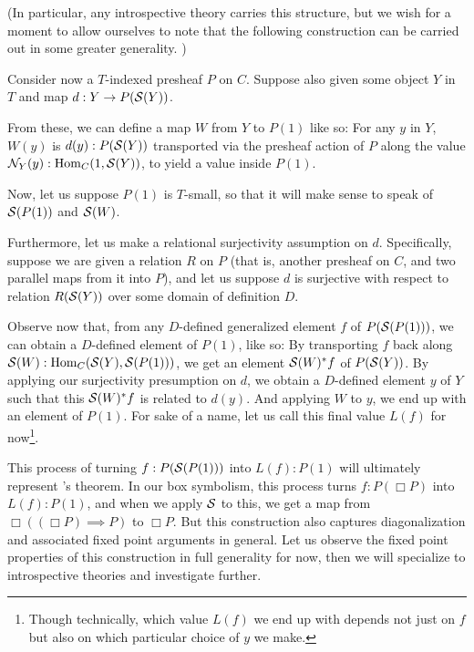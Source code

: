 (In particular, any introspective theory carries this structure, but we wish for a moment to allow ourselves to note that the following construction can be carried out in some greater generality. )

Consider now a $T$-indexed presheaf $P$ on $C$. Suppose also given some object $Y$ in $T$ and map $d : Y \to P(\mathcal{S}(Y))$.

From these, we can define a map $W$ from $Y$ to $P(1)$ like so: For any $y$ in $Y$, $W(y)$ is $d(y) : P(\mathcal{S}(Y))$ transported via the presheaf action of $P$ along the value $\mathcal{N}_Y(y) : \operatorname{Hom}_C(1, \mathcal{S}(Y))$, to yield a value inside $P(1)$.

Now, let us suppose $P(1)$ is $T$-small, so that it will make sense to speak of $\mathcal{S}(P(1))$ and $\mathcal{S}(W)$.

Furthermore, let us make a relational surjectivity assumption on $d$. Specifically, suppose we are given a relation $R$ on $P$ (that is, another presheaf on $C$, and two parallel maps from it into $P$), and let us suppose $d$ is surjective with respect to relation $R(\mathcal{S}(Y))$ over some domain of definition $D$.

Observe now that, from any $D$-defined generalized element $f$ of $P(\mathcal{S}(P(1)))$, we can obtain a $D$-defined element of $P(1)$, like so: By transporting $f$ back along $\mathcal{S}(W) : \operatorname{Hom}_C(\mathcal{S}(Y), \mathcal{S}(P(1)))$, we get an element $\mathcal{S}(W)^*f$ of $P(\mathcal{S}(Y))$. By applying our surjectivity presumption on $d$, we obtain a $D$-defined element $y$ of $Y$ such that this $\mathcal{S}(W)^*f$ is related to $d(y)$. And applying $W$ to $y$, we end up with an element of $P(1)$. For sake of a name, let us call this final value $L(f)$ for now\footnote{Though technically, which value $L(f)$ we end up with depends not just on $f$ but also on which particular choice of $y$ we make.}.

This process of turning $f: P(\mathcal{S}(P(1)))$ into $L(f): P(1)$ will ultimately represent \Loeb's theorem. In our box symbolism, this process turns $f : P(\Box P)$ into $L(f) : P(1)$, and when we apply $\mathcal{S}$ to this, we get a map from $\Box((\Box P) \implies P)$ to $\Box P$. But this construction also captures diagonalization and associated fixed point arguments in general. Let us observe the fixed point properties of this construction in full generality for now, then we will specialize to introspective theories and investigate further.

